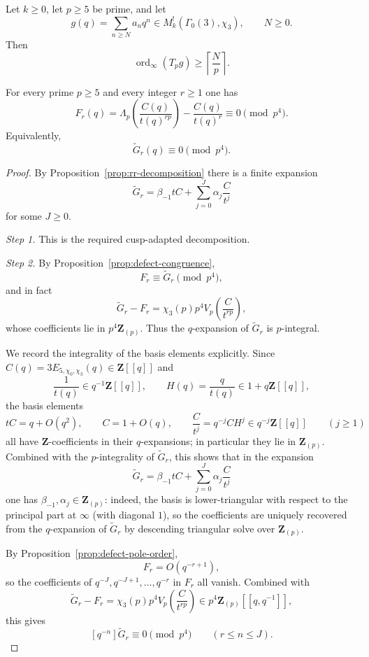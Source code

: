 \documentclass[10pt,a4paper]{amsart}
\DeclareMathOperator{\ord}{ord}
\newcommand{\Z}{\mathbf{Z}}
\begin{document}
\begin{lemma}\label{lem:ordinf-Tp}
Let $k\ge0$, let $p\ge5$ be prime, and let
\[
g(q)=\sum_{n\ge N}a_n q^n\in M_k^!(\Gamma_0(3),\chi_3),
\qquad N\ge 0.
\]
Then
\[
\ord_\infty(T_pg)\ge \left\lceil\frac{N}{p}\right\rceil.
\]
\end{lemma}

\begin{theorem}\label{thm:fricke-vanishing}
For every prime $p\ge5$ and every integer $r\ge1$ one has
\[
F_r(q)=\Lambda_p\!\left(\frac{C(q)}{t(q)^{rp}}\right)-\frac{C(q)}{t(q)^r}\equiv0\pmod{p^4}.
\]
Equivalently,
\[
\widetilde G_r(q)\equiv0\pmod{p^4}.
\]
\end{theorem}

\begin{proof}
By Proposition~\ref{prop:rr-decomposition} there is a finite expansion
\[
\widetilde G_r=\beta_{-1}tC+\sum_{j=0}^{J}\alpha_j\frac{C}{t^j}
\]
for some $J\ge0$.

\emph{Step 1.} This is the required cusp-adapted decomposition.

\emph{Step 2.} By Proposition~\ref{prop:defect-congruence},
\[
F_r\equiv \widetilde G_r \pmod{p^4},
\]
and in fact
\[
\widetilde G_r-F_r=\chi_3(p)p^4V_p\!\left(\frac{C}{t^{rp}}\right),
\]
whose coefficients lie in $p^4\Z_{(p)}$. Thus the $q$-expansion of $\widetilde G_r$ is $p$-integral.

We record the integrality of the basis elements explicitly. Since $C(q)=3E_{5,\chi_0,\chi_3}(q)\in\Z[[q]]$
and
\[
\frac{1}{t(q)}\in q^{-1}\Z[[q]],
\qquad
H(q)=\frac{q}{t(q)}\in 1+q\Z[[q]],
\]
the basis elements
\[
tC=q+O(q^2),\qquad C=1+O(q),\qquad \frac{C}{t^j}=q^{-j}CH^j\in q^{-j}\Z[[q]]
\qquad (j\ge1)
\]
all have $\Z$-coefficients in their $q$-expansions; in particular they lie in $\Z_{(p)}$.
Combined with the $p$-integrality of $\widetilde G_r$, this shows that in the expansion
\[
\widetilde G_r=\beta_{-1}tC+\sum_{j=0}^{J}\alpha_j\frac{C}{t^j}
\]
one has $\beta_{-1},\alpha_j\in\Z_{(p)}$: indeed, the basis is lower-triangular with respect to the
principal part at $\infty$ (with diagonal $1$), so the coefficients are uniquely recovered from the
$q$-expansion of $\widetilde G_r$ by descending triangular solve over $\Z_{(p)}$.

By Proposition~\ref{prop:defect-pole-order},
\[
F_r=O(q^{-r+1}),
\]
so the coefficients of $q^{-J},q^{-J+1},\ldots,q^{-r}$ in $F_r$ all vanish. Combined with
\[
\widetilde G_r-F_r=\chi_3(p)p^4V_p\!\left(\frac{C}{t^{rp}}\right)\in p^4\Z_{(p)}[[q,q^{-1}]],
\]
this gives
\[
[q^{-n}]\widetilde G_r\equiv 0\pmod{p^4}
\qquad (r\le n\le J).
\]


\end{proof}
\end{document}
